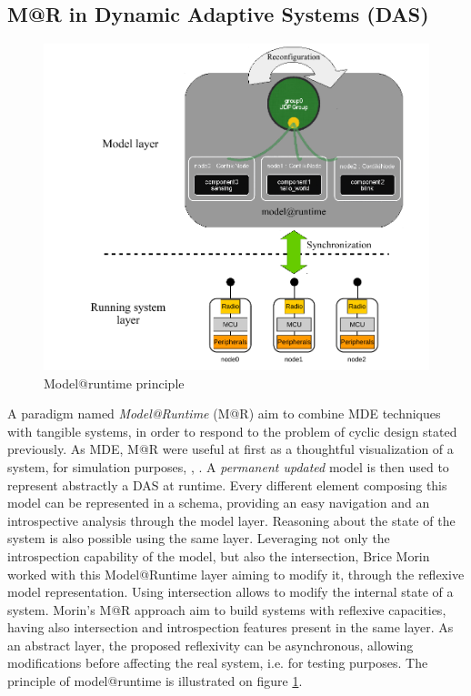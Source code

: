 \subsection{M@R in Dynamic Adaptive Systems (DAS)}
\begin{figure}[htb]
	\centering
	\includegraphics[width=1\columnwidth]{chapters/stateOfTheArt.images/modelsAtRuntime.pdf}
	\caption{Model@runtime principle \label{fig:MAROverview}} 
\end{figure}

A paradigm named \textit{Model@Runtime} (M@R) aim to combine MDE techniques with tangible systems, in order to respond to the problem of cyclic design stated previously.
As MDE, M@R were useful at first as a thoughtful visualization of a system, for simulation purposes\cite{oreizy1999architecture}, \cite{blair2009models}, \cite{zhang2006model}.
A \textit{permanent updated} model is then used to represent abstractly a DAS at runtime.
Every different element composing this model can be represented in a schema, providing an easy navigation and an introspective analysis through the model layer.
Reasoning about the state of the system is also possible using the same layer.
Leveraging not only the introspection capability of the model, but also the intersection, Brice Morin\cite{morin2010leveraging} worked with this Model@Runtime layer aiming to modify it, through the reflexive model representation.
Using intersection allows to modify the internal state of a system\cite{paepcke1993object}.
Morin's M@R approach aim to build systems with reflexive capacities, having also intersection and introspection features present in the same layer.
As an abstract layer, the proposed reflexivity can be asynchronous, allowing modifications before affecting the real system, i.e. for testing purposes. 
The principle of model@runtime is illustrated on figure \ref{fig:MAROverview}.

